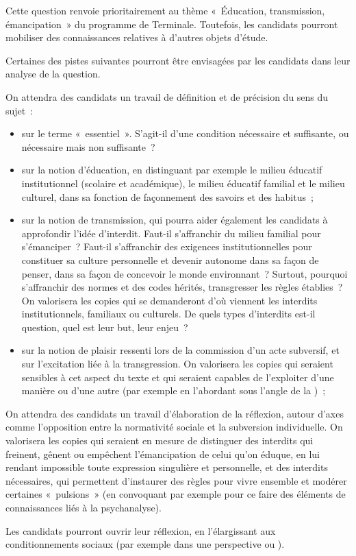 		{Cette question renvoie prioritairement au thème «~Éducation, transmission,
émancipation~» du programme de Terminale. Toutefois, les candidats pourront
mobiliser des connaissances relatives à d'autres objets d'étude.

Certaines des pistes suivantes pourront être envisagées par les candidats dans leur
analyse de la question.

On attendra des candidats un travail de définition et de précision du sens du sujet~:

\begin{itemize}
\item sur le terme «~essentiel~». S'agit-il d'une condition nécessaire et suffisante, ou
nécessaire mais non suffisante~?

\item sur la notion d'éducation, en distinguant par exemple le milieu éducatif institutionnel
(scolaire et académique), le milieu éducatif familial et le milieu culturel, dans sa
fonction de façonnement des savoirs et des habitus~;

\item sur la notion de transmission, qui pourra aider également les candidats à approfondir
l'idée d'interdit. Faut-il s'affranchir du milieu familial pour s'émanciper~? Faut-il
s'affranchir des exigences institutionnelles pour constituer sa culture personnelle et
devenir autonome dans sa façon de penser, dans sa façon de concevoir le monde
environnant~? Surtout, pourquoi s'affranchir des normes et des codes hérités,
transgresser les règles établies~? On valorisera les copies qui se demanderont d'où
viennent les interdits institutionnels, familiaux ou culturels. De quels types d'interdits
est-il question, quel est leur but, leur enjeu~?

\item sur la notion de plaisir ressenti lors de la commission d'un acte subversif, et sur
l'excitation liée à la transgression. On valorisera les copies qui seraient sensibles à cet
aspect du texte et qui seraient capables de l'exploiter d'une manière ou d'une autre
(par exemple en l'abordant sous l'angle de la )~;
\end{itemize}

On attendra des candidats un travail d'élaboration de la réflexion, autour d'axes
comme l'opposition entre la normativité sociale et la subversion individuelle. On
valorisera les copies qui seraient en mesure de distinguer des interdits qui freinent,
gênent ou empêchent l'émancipation de celui qu'on éduque, en lui rendant impossible
toute expression singulière et personnelle, et des interdits nécessaires, qui permettent
d'instaurer des règles pour vivre ensemble et modérer certaines «~pulsions~» (en
convoquant par exemple pour ce faire des éléments de connaissances liés à la
psychanalyse).

Les candidats pourront ouvrir leur réflexion, en l'élargissant aux conditionnements
sociaux (par exemple dans une perspective  ou ).}%

